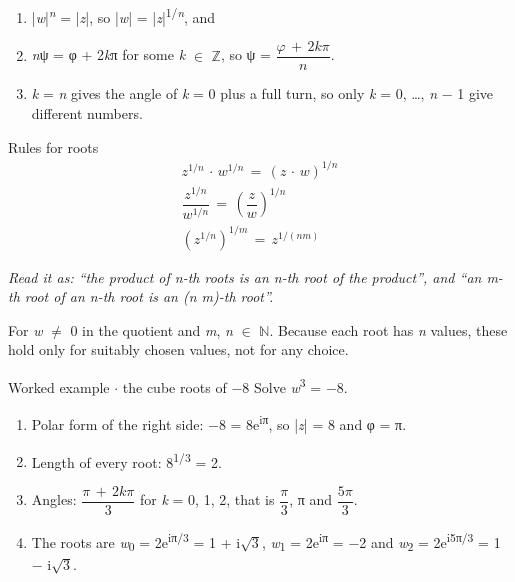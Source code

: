 \documentclass[11pt]{article}
\begin{document}
\begin{keepsection}
\begin{keepsection}
\begin{enumerate}
\item |\textit{w}|\textsuperscript{\textit{n}} = |\textit{z}|, so |\textit{w}| = |\textit{z}|\textsuperscript{1/\textit{n}}, and
\item \textit{n}ψ = φ + 2\textit{k}π for some \textit{k} \ensuremath{\in} \ensuremath{\mathbb{Z}}, so ψ = {\small\ensuremath{\dfrac{φ\, +\, 2{k}π}{{n}}}}.
\item \textit{k} = \textit{n} gives the angle of \textit{k} = 0 plus a full turn, so only \textit{k} = 0, …, \textit{n} \ensuremath{-} 1 give different numbers.
\end{enumerate}

\begin{equationcard}{Rules for roots}
\[ \begin{gathered} {z}^{1/{n}}\, \cdot \, {w}^{1/{n}}\, =\, ({z}\, \cdot \, {w})^{1/{n}} \\ \dfrac{{z}^{1/{n}}}{{w}^{1/{n}}}\, =\, \left(\dfrac{{z}}{{w}}\right)^{1/{n}} \\ ({z}^{1/{n}})^{1/{m}}\, =\, {z}^{1/({n}{m})} \end{gathered} \]
{\small \emph{Read it as: “the product of n-th roots is an n-th root of the product”, and “an m-th root of an n-th root is an (n m)-th root”.}\par For \textit{w} \ensuremath{\neq} 0 in the quotient and \textit{m}, \textit{n} \ensuremath{\in} \ensuremath{\mathbb{N}}. Because each root has \textit{n} values, these hold only for suitably chosen values, not for any choice.}
\end{equationcard}

\begin{workedbox}{Worked example \ensuremath{\cdot} the cube roots of \ensuremath{-}8}
Solve \textit{w}\textsuperscript{3} = \ensuremath{-}8.

\begin{enumerate}
\item Polar form of the right side: \ensuremath{-}8 = 8e\textsuperscript{iπ}, so |\textit{z}| = 8 and φ = π.
\item Length of every root: 8\textsuperscript{1/3} = 2.
\item Angles: {\small\ensuremath{\dfrac{π\, +\, 2{k}π}{3}}} for \textit{k} = 0, 1, 2, that is {\small\ensuremath{\dfrac{π}{3}}}, π and {\small\ensuremath{\dfrac{5π}{3}}}.
\item The roots are \textit{w}\textsubscript{0} = 2e\textsuperscript{iπ/3} = 1 + i\ensuremath{\sqrt{3}}, \textit{w}\textsubscript{1} = 2e\textsuperscript{iπ} = \ensuremath{-}2 and \textit{w}\textsubscript{2} = 2e\textsuperscript{i5π/3} = 1 \ensuremath{-} i\ensuremath{\sqrt{3}}.
\end{enumerate}


\end{workedbox}
\end{keepsection}
\end{keepsection}
\end{document}
